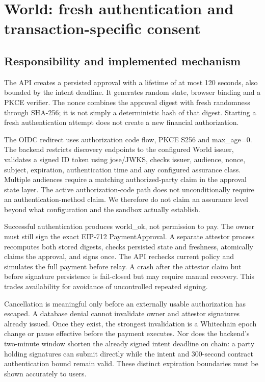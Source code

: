 \documentclass[11pt]{article}
\begin{document}

\section{World: fresh authentication and transaction-specific consent}
\subsection{Responsibility and implemented mechanism}
The API creates a persisted approval with a lifetime of at most 120 seconds, also bounded by the intent deadline. It generates random state, browser binding and a PKCE verifier. The nonce combines the approval digest with fresh randomness through SHA-256; it is not simply a deterministic hash of that digest. Starting a fresh authentication attempt does not create a new financial authorization.

The OIDC redirect uses authorization code flow, PKCE S256 and max\_age=0. The backend restricts discovery endpoints to the configured World issuer, validates a signed ID token using jose/JWKS, checks issuer, audience, nonce, subject, expiration, authentication time and any configured assurance class. Multiple audiences require a matching authorized-party claim in the approval state layer. The active authorization-code path does not unconditionally require an authentication-method claim. We therefore do not claim an assurance level beyond what configuration and the sandbox actually establish.

Successful authentication produces world\_ok, not permission to pay. The owner must still sign the exact EIP-712 PaymentApproval. A separate attestor process recomputes both stored digests, checks persisted state and freshness, atomically claims the approval, and signs once. The API rechecks current policy and simulates the full payment before relay. A crash after the attestor claim but before signature persistence is fail-closed but may require manual recovery. This trades availability for avoidance of uncontrolled repeated signing.

Cancellation is meaningful only before an externally usable authorization has escaped. A database denial cannot invalidate owner and attestor signatures already issued. Once they exist, the strongest invalidation is a Whitechain epoch change or pause effective before the payment executes. Nor does the backend's two-minute window shorten the already signed intent deadline on chain: a party holding signatures can submit directly while the intent and 300-second contract authentication bound remain valid. These distinct expiration boundaries must be shown accurately to users.
\end{document}
